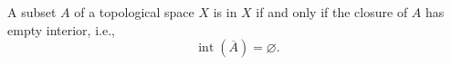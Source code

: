A subset $A$ of a topological space $X$ is  in $X$ if and only if the closure of $A$ has empty interior, i.e.,
$$\operatorname{int}(\overline{A}) = \varnothing.$$
